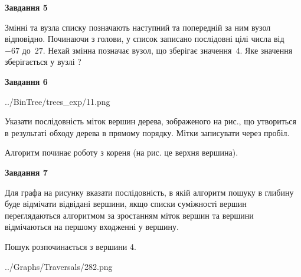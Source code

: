 \documentclass[12pt, ukrainian]{article}
\begin{document}
{\begin {large}
{\begin {center}\textbf{Завдання 5}\end {center}}\par
Змінні  та  вузла списку позначають наступний та попередній за ним вузол відповідно. Починаючи з голови, у список записано послідовні цілі числа від~$-67$ до~$27$. Нехай змінна  позначає вузол, що зберігає значення~$4$.
Яке значення зберігається у вузлі  ?\par
\newpage

{\begin {center}\textbf{Завдання 6}\end {center}}\par

\begin{center}
	{../BinTree/trees_exp/11.png}
\end{center}
Указати послідовність міток вершин дерева, зображеного на рис., що утвориться в результаті обходу дерева в прямому порядку. Мітки записувати через пробіл.\par Алгоритм починає роботу з кореня (на рис. це верхня вершина).\par
\newpage

{\begin {center}\textbf{Завдання 7}\end {center}}\par
Для графа на рисунку вказати послідовність, в якій алгоритм пошуку в глибину буде відмічати відвідані вершини, якщо списки суміжності вершин переглядаються алгоритмом за зростанням міток вершин та вершини відмічаються на першому вход\-женні у вершину.\par
Пошук розпочинається з вершини 4.\par

\begin{center}
	{../Graphs/Traversals/282.png}
\end{center}\par
\newpage


\end{large}}
\end{document}
